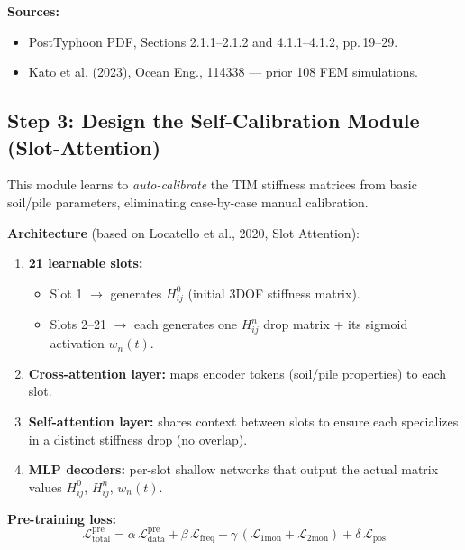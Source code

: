 \documentclass[11pt,a4paper]{article}
\begin{document}
\textbf{Sources:}
\begin{itemize}[noitemsep]
  \item PostTyphoon PDF, Sections 2.1.1--2.1.2 and 4.1.1--4.1.2, pp.\,19--29.
  \item Kato et al. (2023), Ocean Eng., 114338 --- prior 108 FEM simulations.
\end{itemize}

\subsection{Step 3: Design the Self-Calibration Module (Slot-Attention)}

This module learns to \textit{auto-calibrate} the TIM stiffness matrices from basic
soil/pile parameters, eliminating case-by-case manual calibration.

\textbf{Architecture} (based on Locatello et al., 2020, Slot Attention):
\begin{enumerate}[noitemsep]
  \item \textbf{21 learnable slots:}
    \begin{itemize}[noitemsep]
      \item Slot 1 $\rightarrow$ generates $H^0_{ij}$ (initial 3DOF stiffness matrix).
      \item Slots 2--21 $\rightarrow$ each generates one $H^n_{ij}$ drop matrix + its
            sigmoid activation $w_n(t)$.
    \end{itemize}
  \item \textbf{Cross-attention layer:} maps encoder tokens (soil/pile properties)
        to each slot.
  \item \textbf{Self-attention layer:} shares context between slots to ensure each
        specializes in a distinct stiffness drop (no overlap).
  \item \textbf{MLP decoders:} per-slot shallow networks that output the actual
        matrix values $H^0_{ij}$, $H^n_{ij}$, $w_n(t)$.
\end{enumerate}

\textbf{Pre-training loss:}
\begin{equation}
  \mathcal{L}_{\text{total}}^{\text{pre}} = \alpha\,\mathcal{L}_{\text{data}}^{\text{pre}}
  + \beta\,\mathcal{L}_{\text{freq}}
  + \gamma\,(\mathcal{L}_{\text{1mon}} + \mathcal{L}_{\text{2mon}})
  + \delta\,\mathcal{L}_{\text{pos}}
\end{equation}
\end{document}
